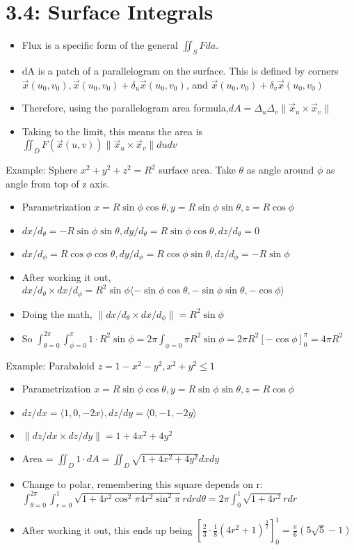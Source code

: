 \documentclass[11pt, oneside]{article}   	%
\begin{document}
\section{3.4: Surface Integrals}
\begin{itemize}
\item Flux is a specific form of the general $\iint_S F da$.
\item dA is a patch of a parallelogram on the surface.  This is defined by corners $\vec{x}(u_0, v_0), \vec{x}(u_0, v_0) + \delta_u \vec{x}(u_0, v_0)$, and $\vec{x}(u_0, v_0) + \delta_v \vec{x}(u_0, v_0)$
\item Therefore, using the parallelogram area formula,$dA = \Delta_u \Delta_v \| \vec{x}_u \times \vec{x}_v \|$
\item Taking to the limit, this means the area is $\iint_D F(\vec{x}(u,v)) \|\vec{x}_u \times \vec{x}_v \| du dv$
\end{itemize}

Example: Sphere $x^2 + y^2 + z^2 = R^2$ surface area.  Take $\theta$ as angle around $\phi$ as angle from top of z axis.
\begin{itemize}
\item Parametrization $x = R \sin \phi \cos \theta,  y = R \sin \phi \sin \theta,  z = R \cos \phi$
\item $dx/d_{\theta} =  -R \sin \phi \sin \theta, dy/d_{\theta} =  R \sin \phi \cos \theta, dz/d_{\theta} =  0$
\item $dx/d_{\phi} =  R \cos \phi \cos \theta, dy/d_{\phi} =  R \cos \phi \sin \theta, dz/d_{\phi} =  -R \sin \phi$
\item After working it out, $dx/d_{\theta} \times dx/d_{\phi} = R^2 \sin \phi \langle -\sin \phi \cos \theta,  -\sin \phi \sin \theta, -\cos \phi \rangle$ 
\item Doing the math, $ \|dx/d_{\theta} \times dx/d_{\phi} \| = R^2 \sin \phi $
\item So $\int_{\theta = 0}^{2\pi} \int_{\phi = 0}^{\pi} 1 \cdot  R^2 \sin \phi = 2 \pi \int_{\phi = 0}{\pi} R^2 \sin \phi  = 2\pi R^2 [ -\cos \phi]_0^{\pi} = 4 \pi R^2$
\end{itemize}

Example: Parabaloid $z = 1 - x^2 - y^2, x^2 + y^2 \leq 1$
\begin{itemize}
\item Parametrization $x = R \sin \phi \cos \theta,  y = R \sin \phi \sin \theta,  z = R \cos \phi$
\item $dz/dx = \langle 1, 0, -2x \rangle, dz/dy = \langle 0, -1, -2y \rangle$
\item $\| dz/dx \times dz/dy \| = 1 + 4x^2 + 4y^2$
\item Area = $\iint_D 1 \cdot dA = \iint_D \sqrt{ 1 + 4x^2 + 4y^2} dx dy$
\item Change to polar, remembering this square depends on r: $\int_{\theta = 0}^{2\pi} \int_{r = 0}^{1} \sqrt{ 1 + 4r^2 \cos^2\pi  4r^2 \sin^2\pi} r dr d\theta = 2\pi\int_0^1 \sqrt{1 + 4r^2}rdr$
\item After working it out, this ends up being $[\frac{2}{3} \cdot \frac{1}{8}(4r^2 +1)^{\frac{3}{2}}]_0^1 = \frac{\pi}{6} (5\sqrt{5} - 1)$
\end{itemize}
\end{document}
